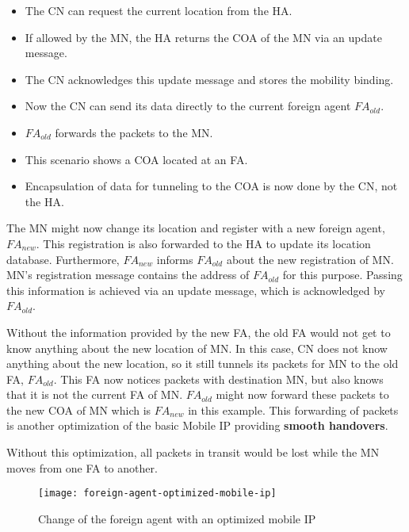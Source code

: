 \begin{itemize}
	\item The CN can request the current location from the HA. 
	\item If allowed by the MN, the HA returns the COA of the MN via an update message. 
	\item The CN acknowledges this update message and stores the mobility binding. 
	\item Now the CN can send its data directly to the current foreign agent $FA_{old}$. 
	\item $ FA_{old} $ forwards the packets to the MN. 
	\item This scenario shows a COA located at an FA. 
	\item Encapsulation of data for tunneling to the COA is now done by the CN, not the HA.
\end{itemize}


The MN might now change its location and register with a new foreign agent, $ FA_{new} $. This registration is also forwarded to the HA to update its location database. Furthermore, $ FA_{new} $ informs $ FA_{old} $ about the new registration of MN. MN’s registration message contains the address of $ FA_{old} $ for this purpose. Passing
this information is achieved via an update message, which is acknowledged by $ FA_{old} $. 

Without the information provided by the new FA, the old FA would not get to know anything about the new location of MN. In this case, CN does not know anything about the new location, so it still tunnels its packets for MN to the old FA, $ FA_{old} $. This FA now notices packets with destination MN, but also knows that it is not the current FA of MN. $ FA_{old} $ might now forward these packets to the new COA of MN which is $ FA_{new} $ in this example. This forwarding of packets is another optimization of the basic Mobile IP providing \textbf{smooth handovers}. 

Without this optimization, all packets in transit would be lost while the MN moves from one FA to another. %

	\begin{figure}[ht!]
	\centering
	\texttt{[image: foreign-agent-optimized-mobile-ip]}
	\caption{Change of the foreign agent with an optimized mobile IP}\label{fig:foreign-agent-optimized-mobile-ip}
	\end{figure}


